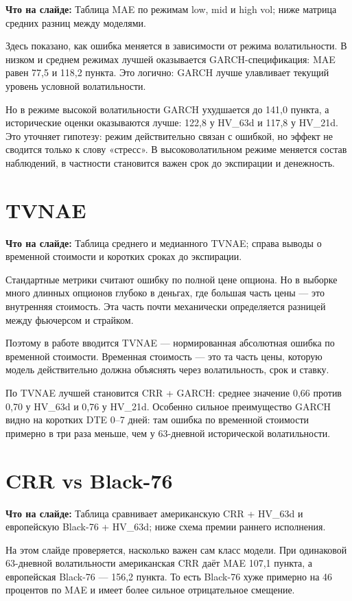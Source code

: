 \documentclass[11pt,a4paper]{article}
\newcommand{\whatsonslide}[1]{%
  \noindent\colorbox{softblue}{%
    \parbox{\dimexpr\linewidth-2\fboxsep\relax}{\textbf{Что на слайде:} #1}%
  }\par\vspace{0.2em}
}
\begin{document}
\whatsonslide{Таблица MAE по режимам low, mid и high vol; ниже матрица средних разниц между моделями.}

Здесь показано, как ошибка меняется в зависимости от режима волатильности. В низком и среднем режимах лучшей оказывается GARCH-спецификация: MAE равен 77,5 и 118,2 пункта. Это логично: GARCH лучше улавливает текущий уровень условной волатильности.

Но в режиме высокой волатильности GARCH ухудшается до 141,0 пункта, а исторические оценки оказываются лучше: 122,8 у HV\_63d и 117,8 у HV\_21d. Это уточняет гипотезу: режим действительно связан с ошибкой, но эффект не сводится только к слову «стресс». В высоковолатильном режиме меняется состав наблюдений, в частности становится важен срок до экспирации и денежность.

\section{TVNAE}

\whatsonslide{Таблица среднего и медианного TVNAE; справа выводы о временной стоимости и коротких сроках до экспирации.}

Стандартные метрики считают ошибку по полной цене опциона. Но в выборке много длинных опционов глубоко в деньгах, где большая часть цены --- это внутренняя стоимость. Эта часть почти механически определяется разницей между фьючерсом и страйком.

Поэтому в работе вводится TVNAE --- нормированная абсолютная ошибка по временной стоимости. Временная стоимость --- это та часть цены, которую модель действительно должна объяснять через волатильность, срок и ставку.

По TVNAE лучшей становится CRR + GARCH: среднее значение 0,66 против 0,70 у HV\_63d и 0,76 у HV\_21d. Особенно сильное преимущество GARCH видно на коротких DTE 0--7 дней: там ошибка по временной стоимости примерно в три раза меньше, чем у 63-дневной исторической волатильности.

\section{CRR vs Black-76}

\whatsonslide{Таблица сравнивает американскую CRR + HV\_63d и европейскую Black-76 + HV\_63d; ниже схема премии раннего исполнения.}

На этом слайде проверяется, насколько важен сам класс модели. При одинаковой 63-дневной волатильности американская CRR даёт MAE 107,1 пункта, а европейская Black-76 --- 156,2 пункта. То есть Black-76 хуже примерно на 46 процентов по MAE и имеет более сильное отрицательное смещение.
\end{document}
